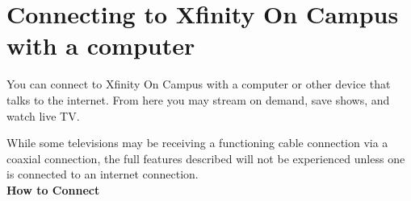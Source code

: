 \documentclass[a4paper, 11pt]{article}
\begin{document}



\section*{
  Connecting to Xfinity On Campus with a computer
}

You can connect to Xfinity On Campus with a computer or other device that
talks to the internet.  From here you may stream on demand, save shows, and 
watch live TV. 

While some televisions may be receiving a functioning cable connection via
a coaxial connection, the full features described will not be 
experienced unless one is connected to an internet connection.\\
{\newline}
\textbf{How to Connect}
\end{document}
